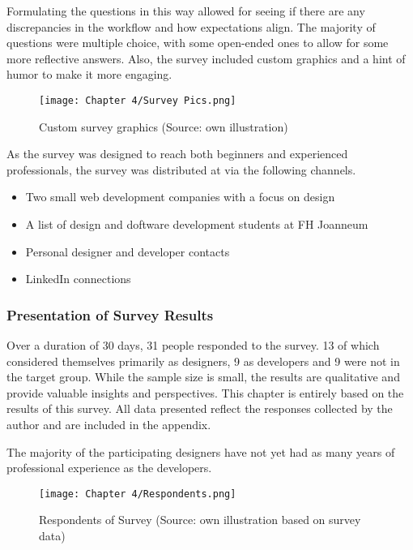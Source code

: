 Formulating the questions in this way allowed for seeing if there are any discrepancies in the
workflow and how expectations align. The majority of questions were multiple choice, with some
open-ended ones to allow for some more reflective answers. Also, the survey included custom graphics
and a hint of humor to make it more engaging.
\begin{figure}[H]
    \centering
    \texttt{[image: Chapter 4/Survey Pics.png]}
    \caption{Custom survey graphics (Source: own illustration)}
\end{figure}

As the survey was designed to reach both beginners and experienced professionals, the survey was
distributed at via the following channels.
\begin{itemize}
    \item Two small web development companies with a focus on design
    \item A list of design and doftware development students at FH Joanneum
    \item Personal designer and developer contacts
    \item LinkedIn connections
\end{itemize}

\subsubsection{Presentation of Survey Results}
Over a duration of 30 days, 31 people responded to the survey. 13 of which considered themselves
primarily as designers, 9 as developers and 9 were not in the target group. While the sample size is
small, the results are qualitative and provide valuable insights and perspectives. This chapter is
entirely based on the results of this survey. All data presented reflect the responses collected by
the author and are included in the appendix.

The majority of the participating designers have not yet had as many years of professional
experience as the developers.
\begin{figure}[H]
    \centering
    \texttt{[image: Chapter 4/Respondents.png]}
    \caption{Respondents of Survey (Source: own illustration based on survey data)}
\end{figure}

